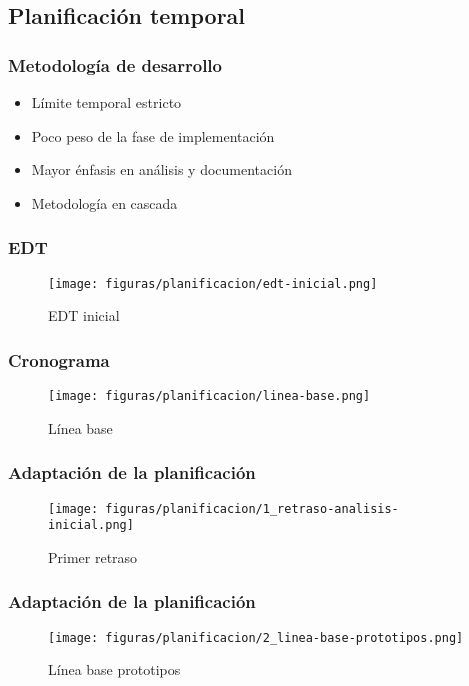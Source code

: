\documentclass{beamer}
\begin{document}
\subsection{Planificación temporal}

\begin{frame}
    \frametitle{Metodología de desarrollo}   
    \begin{itemize}
        \item Límite temporal estricto \pause
        \item Poco peso de la fase de implementación \pause
        \item Mayor énfasis en análisis y documentación \pause
        \item Metodología en cascada
    \end{itemize} 
\end{frame}

\begin{frame}[plain]
    \frametitle{EDT}
    \begin{figure}[H]
        \centerline{\texttt{[image: figuras/planificacion/edt-inicial.png]}}
        \caption{EDT inicial}
    \end{figure}
\end{frame}

\begin{frame}[plain]
    \frametitle{Cronograma}
    \begin{figure}[H]
        \centerline{\texttt{[image: figuras/planificacion/linea-base.png]}}
        \caption{Línea base}
    \end{figure}
\end{frame}

\begin{frame}[plain]
    \frametitle{Adaptación de la planificación}
    \begin{figure}[H]
        \centerline{\texttt{[image: figuras/planificacion/1\_retraso-analisis-inicial.png]}}
        \caption{Primer retraso}
    \end{figure}
\end{frame}

\begin{frame}[plain]
    \frametitle{Adaptación de la planificación}
    \begin{figure}[H]
        \centerline{\texttt{[image: figuras/planificacion/2\_linea-base-prototipos.png]}}
        \caption{Línea base prototipos}
    \end{figure}
\end{frame}
\end{document}
